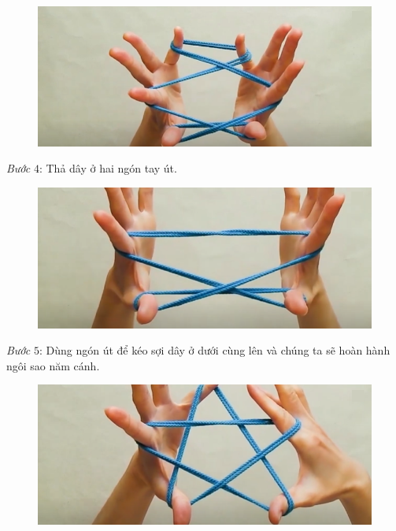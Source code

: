 \begin{multicols}{2}
\begin{figure}[H]
		\vspace*{1.8pt}
		\hspace*{2pt}\includegraphics[width=0.852\linewidth]{3d}
		\vspace*{-10pt}
	\end{figure}
	\textit{Bước} $4$: Thả dây ở hai ngón tay út.
	\begin{figure}[H]
		\vspace*{-5pt}
		\centering
		\captionsetup{labelformat= empty, justification=centering}
		\includegraphics[width= 0.85\linewidth]{4}
		\vspace*{-10pt}
	\end{figure}
	\textit{Bước} $5$: Dùng ngón út để kéo sợi dây ở dưới cùng lên và chúng ta sẽ hoàn hành ngôi sao năm cánh.
	\begin{figure}[H]
		\vspace*{5pt}
		\centering
		\captionsetup{labelformat= empty, justification=centering}
		\includegraphics[width= 0.85\linewidth]{5}
		\vspace*{-5pt}
	\end{figure}

\end{multicols}
